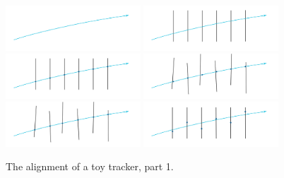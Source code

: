 \begin{figure}[htb]
    \begin{center}
          \includegraphics[width=0.45\textwidth]{../figs/Alignment/toyTracker01.png}
          \includegraphics[width=0.45\textwidth]{../figs/Alignment/toyTracker02.png}
        \includegraphics[width=0.45\textwidth]{../figs/Alignment/toyTracker03.png}
        \includegraphics[width=0.45\textwidth]{../figs/Alignment/toyTracker04.png}
        \includegraphics[width=0.45\textwidth]{../figs/Alignment/toyTracker05.png}
        \includegraphics[width=0.45\textwidth]{../figs/Alignment/toyTracker06.png}
    \end{center}
    \caption{The alignment of a toy tracker, part 1.}
    \label{fig:toyTracker_part1}
\end{figure}

